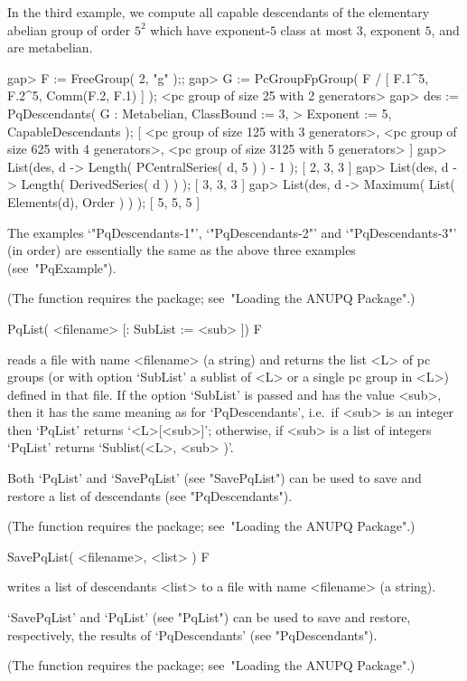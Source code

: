In  the  third  example,  we  compute  all  capable  descendants  of  the
elementary abelian group of order  $5^2$ which have exponent-$5$ class at
most $3$, exponent $5$, and are metabelian.

\beginexample
gap> F := FreeGroup( 2, "g" );;                                  
gap> G := PcGroupFpGroup( F / [ F.1^5, F.2^5, Comm(F.2, F.1) ] );
<pc group of size 25 with 2 generators>
gap> des := PqDescendants( G : Metabelian, ClassBound := 3,
>                              Exponent := 5, CapableDescendants );
[ <pc group of size 125 with 3 generators>, 
  <pc group of size 625 with 4 generators>, 
  <pc group of size 3125 with 5 generators> ]
gap> List(des, d -> Length( PCentralSeries( d, 5 ) ) - 1 );
[ 2, 3, 3 ]
gap> List(des, d -> Length( DerivedSeries( d ) ) );
[ 3, 3, 3 ]
gap> List(des, d -> Maximum( List( Elements(d), Order ) ) );     
[ 5, 5, 5 ]
\endexample

The     examples     `"PqDescendants-1"',     `"PqDescendants-2"'     and
`"PqDescendants-3"' (in order) are essentially  the  same  as  the  above
three examples (see~"PqExample").

(The function requires  the  {\ANUPQ}  package;  see~"Loading  the  ANUPQ
Package".)

\>PqList( <filename> [: SubList := <sub> ]) F

reads a file with name <filename> (a string) and returns the list <L>  of
pc groups (or with option `SubList' a sublist of <L> or a single pc group
in <L>) defined in that file. If the option `SubList' is passed  and  has
the value <sub>, then it has the same  meaning  as  for  `PqDescendants',
i.e.~if  <sub>  is  an  integer  then  `PqList'   returns   `<L>[<sub>]';
otherwise, if <sub> is a list of integers `PqList' returns  `Sublist(<L>,
<sub> )'.

Both `PqList' and `SavePqList' (see "SavePqList") can be used to save and
restore a list of descendants (see "PqDescendants").

(The function requires  the  {\ANUPQ}  package;  see~"Loading  the  ANUPQ
Package".)

\>SavePqList( <filename>, <list> ) F

writes a list of descendants <list> to a file  with  name  <filename>  (a
string).

`SavePqList' and `PqList' (see "PqList") can be used to save and restore,
respectively, the results of `PqDescendants' (see "PqDescendants").

(The function requires  the  {\ANUPQ}  package;  see~"Loading  the  ANUPQ
Package".)

